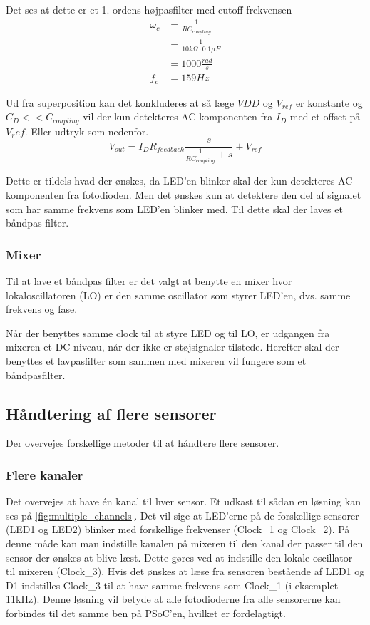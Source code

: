 \documentclass[HardwareDesign/HardwareDesign_main.tex]{subfiles}
\begin{document}
Det ses at dette er et 1. ordens højpasfilter med cutoff frekvensen 
\begin{align}
\omega_c &= \frac{1}{RC_{coupling} }\\
&= \frac{1}{10\si{k\Omega} \cdot 0.1\si{\mu F}}\\
&= 1000 \si{\frac{rad}{s}}\\
f_c &= 159 \si{Hz}
\end{align}

Ud fra superposition kan det konkluderes at så læge $VDD$ og $V_{ref}$ er konstante og $C_D << C_{coupling}$ vil der kun detekteres AC komponenten fra $I_D$ med et offset på $V_ref$. Eller udtryk som nedenfor.
$$V_{out} = I_D R_{feedback} \frac{s}{\frac{1}{R C_{coupling}} + s} + V_{ref}$$

Dette er tildels hvad der ønskes, da LED'en blinker skal der kun detekteres AC komponenten fra fotodioden. Men det ønskes kun at detektere den del af signalet som har samme frekvens som LED'en blinker med. Til dette skal der laves et båndpas filter.

\subsubsection{Mixer}
Til at lave et båndpas filter er det valgt at benytte en mixer hvor lokaloscillatoren (LO) er den samme oscillator som styrer LED'en, dvs. samme frekvens og fase. 

Når der benyttes samme clock til at styre LED og til LO, er udgangen fra mixeren et DC niveau, når der ikke er støjsignaler tilstede. Herefter skal der benyttes et lavpasfilter som sammen med mixeren vil fungere som et båndpasfilter.

\newpage
\subsection{Håndtering af flere sensorer}

Der overvejes forskellige metoder til at håndtere flere sensorer.
\subsubsection{Flere kanaler}
Det overvejes at have én kanal til hver sensor. Et udkast til sådan en løsning kan ses på \ref{fig:multiple_channels}. Det vil sige at LED'erne på de forskellige sensorer (LED1 og LED2) blinker med forskellige frekvenser (Clock\_1 og Clock\_2). På denne måde kan man indstille kanalen på mixeren til den kanal der passer til den sensor der ønskes at blive læst. Dette gøres ved at indstille den lokale oscillator til mixeren (Clock\_3). Hvis det ønskes at læse fra sensoren bestående af LED1 og D1 indstilles Clock\_3 til at have samme frekvens som Clock\_1 (i eksemplet 11kHz). Denne løsning vil betyde at alle fotodioderne fra alle sensorerne kan forbindes til det samme ben på PSoC'en, hvilket er fordelagtigt.
\end{document}
